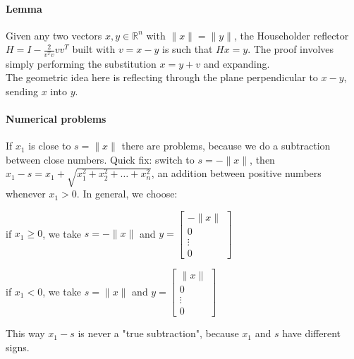 \documentclass[10pt]{report}
\begin{document}
\paragraph{Lemma} Given any two vectors $x,y\in \mathbb{R}^n$ with $\|x\| = \|y\|$, the Householder reflector $H = I - \frac{2}{v^Tv}vv^T$ built with $v = x-y$ is such that $Hx = y$. The proof involves simply performing the substitution $x = y + v$ and expanding.\\
The geometric idea here is reflecting through the plane perpendicular to $x-y$, sending $x$ into $y$.
\paragraph{Numerical problems} If $x_1$ is close to $s = \|x\|$ there are problems, because we do a subtraction between close numbers. Quick fix: switch to $s = -\|x\|$, then $x_1 - s = x_1 + \sqrt{x_1^2+x_2^2+\ldots+x_n^2}$, an addition between positive numbers whenever $x_1 > 0$. In general, we choose:
\begin{list}{}{}
	\item if $x_1 \geq 0$, we take $s = -\|x\|$ and $y = \left[\begin{array}{c}
	-\|x\|\\0\\\vdots\\0
	\end{array}\right]$
	\item if $x_1 < 0$, we take $s = \|x\|$ and $y = \left[\begin{array}{c}
	\|x\|\\0\\\vdots\\0
	\end{array}\right]$
\end{list}
This way $x_1 - s$ is never a "true subtraction", because $x_1$ and $s$ have different signs.
\end{document}
